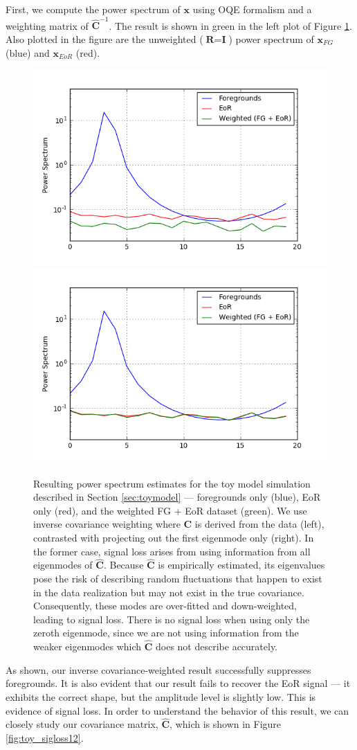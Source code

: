 \documentclass[preprint2,numberedappendix,tighten]{aastex6}  %
\begin{document}
First, we compute the power spectrum of $\textbf{x}$ using OQE formalism and a weighting matrix of $\hat{\textbf{C}}^{-1}$. The result is shown in green in the left plot of Figure \ref{fig:toy_sigloss3}. Also plotted in the figure are the unweighted ($\textbf{R} = \textbf{I}$) power spectrum of $\textbf{x}_{FG}$ (blue) and $\textbf{x}_{EoR}$ (red). 

\begin{figure}
	\centering
	\includegraphics[trim={0.3cm 0.2cm 1cm 0.3cm},clip,height=0.3\textwidth]{plots/toy_sigloss3.png}
	\includegraphics[trim={1cm 0.2cm 0cm 0.3cm},clip,height=0.3\textwidth]{plots/toy_sigloss4.png}
	\caption{Resulting power spectrum estimates for the toy model simulation described in Section \ref{sec:toymodel} --- foregrounds only (blue), EoR only (red), and the weighted FG + EoR dataset (green). We use inverse covariance weighting where $\textbf{C}$ is derived from the data (left), contrasted with projecting out the first eigenmode only (right). In the former case, signal loss arises from using information from all eigenmodes of $\hat{\textbf{C}}$. Because $\hat{\textbf{C}}$ is empirically estimated, its eigenvalues pose the risk of describing random fluctuations that happen to exist in the data realization but may not exist in the true covariance. Consequently, these modes are over-fitted and down-weighted, leading to signal loss. There is no signal loss when using only the zeroth eigenmode, since we are not using information from the weaker eigenmodes which $\hat{\textbf{C}}$ does not describe accurately.}
	\label{fig:toy_sigloss3}
\end{figure}

As shown, our inverse covariance-weighted result successfully suppresses foregrounds. It is also evident that our result fails to recover the EoR signal --- it exhibits the correct shape, but the amplitude level is slightly low. This is evidence of signal loss. In order to understand the behavior of this result, we can closely study our covariance matrix, $\hat{\textbf{C}}$, which is shown in Figure \ref{fig:toy_sigloss12}.
\end{document}
